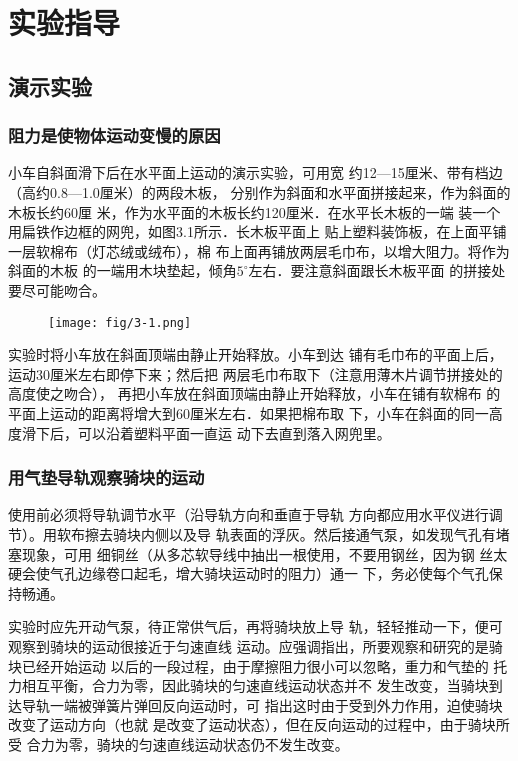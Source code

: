 \section{实验指导}
\subsection{演示实验}

\subsubsection{阻力是使物体运动变慢的原因}
小车自斜面滑下后在水平面上运动的演示实验，可用宽
约12—15厘米、带有档边（高约0.8—1.0厘米）的两段木板，
分别作为斜面和水平面拼接起来，作为斜面的木板长约60厘
米，作为水平面的木板长约120厘米．在水平长木板的一端
装一个用扁铁作边框的网兜，如图3.1所示．长木板平面上
贴上塑料装饰板，在上面平铺一层软棉布（灯芯绒或绒布），棉
布上面再铺放两层毛巾布，以增大阻力。将作为斜面的木板
的一端用木块垫起，倾角$5^{\circ}$左右．要注意斜面跟长木板平面
的拼接处要尽可能吻合。
\begin{figure}[htp]
    \centering
    \texttt{[image: fig/3-1.png]}
    \caption{}
\end{figure}

实验时将小车放在斜面顶端由静止开始释放。小车到达
铺有毛巾布的平面上后，运动30厘米左右即停下来；然后把
两层毛巾布取下（注意用薄木片调节拼接处的高度使之吻合），
再把小车放在斜面顶端由静止开始释放，小车在铺有软棉布
的平面上运动的距离将增大到60厘米左右．如果把棉布取
下，小车在斜面的同一高度滑下后，可以沿着塑料平面一直运
动下去直到落入网兜里。

\subsubsection{用气垫导轨观察骑块的运动}
使用前必须将导轨调节水平（沿导轨方向和垂直于导轨
方向都应用水平仪进行调节）。用软布擦去骑块内侧以及导
轨表面的浮灰。然后接通气泵，如发现气孔有堵塞现象，可用
细铜丝（从多芯软导线中抽出一根使用，不要用钢丝，因为钢
丝太硬会使气孔边缘卷口起毛，增大骑块运动时的阻力）通一
下，务必使每个气孔保持畅通。

实验时应先开动气泵，待正常供气后，再将骑块放上导
轨，轻轻推动一下，便可观察到骑块的运动很接近于匀速直线
运动。应强调指出，所要观察和研究的是骑块已经开始运动
以后的一段过程，由于摩擦阻力很小可以忽略，重力和气垫的
托力相互平衡，合力为零，因此骑块的匀速直线运动状态并不
发生改变，当骑块到达导轨一端被弹簧片弹回反向运动时，可
指出这时由于受到外力作用，迫使骑块改变了运动方向（也就
是改变了运动状态），但在反向运动的过程中，由于骑块所受
合力为零，骑块的匀速直线运动状态仍不发生改变。

